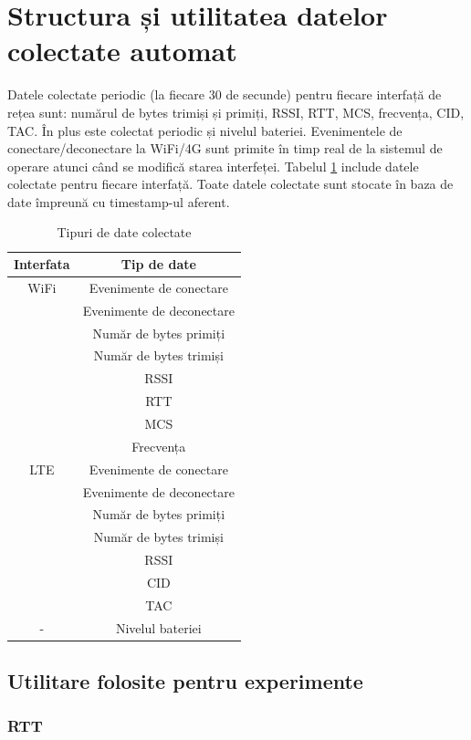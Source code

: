 \section{Structura și utilitatea datelor colectate automat}

Datele colectate periodic (la fiecare 30 de secunde) pentru fiecare interfață de rețea sunt: numărul de bytes trimiși și primiți, RSSI, RTT, MCS, frecvența, CID, TAC.  În plus este colectat periodic și nivelul bateriei. Evenimentele de conectare/deconectare la WiFi/4G sunt primite în timp real de la sistemul de operare atunci când se modifică starea interfeței.  Tabelul \ref{tab:date} include datele colectate pentru fiecare interfață. Toate datele colectate sunt stocate în baza de date împreună cu timestamp-ul aferent.

\begin{table}[h!]
\centering
\caption{Tipuri de date colectate}
\label{tab:date}
\begin{tabular}{c | c}
\hline
Interfata & Tip de date  \\
\hline
WiFi & Evenimente de conectare \\
 & Evenimente de deconectare \\
 & Număr de bytes primiți \\
 & Număr de bytes trimiși \\
 & RSSI \\
 & RTT \\
 & MCS \\
 & Frecvența \\
\hline
LTE & Evenimente de conectare \\
 & Evenimente de deconectare \\
 & Număr de bytes primiți \\
 & Număr de bytes trimiși \\
 & RSSI \\
 & CID \\
 & TAC \\
\hline
- & Nivelul bateriei \\
\hline
\end{tabular}
\end{table}

\subsection{Utilitare folosite pentru experimente}

\subsubsection{RTT}

